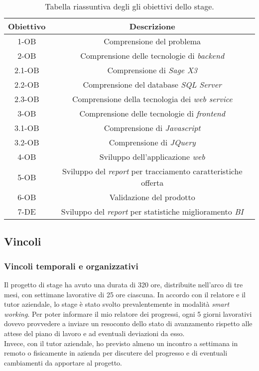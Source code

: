 \begin{center}
	\begin{longtable}{ | c| c |}
		\caption{Tabella riassuntiva degli gli obiettivi dello stage.}\\
		\hline
		\textbf{Obiettivo} & \textbf{Descrizione}\\
		\hline
		1-OB & Comprensione del problema\\
		\hline
		2-OB & Comprensione delle tecnologie di \textit{backend}\\
		\hline
		2.1-OB & Comprensione di \textit{Sage X3}\\
		\hline
		2.2-OB & Comprensione del database \textit{SQL Server}\\
		\hline
		2.3-OB & Comprensione della tecnologia dei \textit{web service}\\
		\hline
		3-OB & Comprensione delle tecnologie di \textit{frontend}\\
		\hline
		3.1-OB & Comprensione di \textit{Javascript}\\
		\hline
		3.2-OB & Comprensione di \textit{JQuery}\\
		\hline
		4-OB & Sviluppo dell'applicazione \textit{web}\\
		\hline
		5-OB & Sviluppo del \textit{report} per tracciamento caratteristiche offerta\\
		\hline
		6-OB & Validazione del prodotto\\
		\hline
		7-DE & Sviluppo del \textit{report} per statistiche miglioramento \textit{BI}\\
		\hline
	\end{longtable}
\end{center}


\subsection{Vincoli}
\subsubsection{Vincoli temporali e organizzativi}
Il progetto di stage ha avuto una durata di 320 ore, distribuite nell'arco di tre mesi, con settimane lavorative di 25 ore ciascuna.
In accordo con il relatore e il tutor aziendale, lo stage è stato svolto prevalentemente in modalità \textit{smart working}.
Per poter informare il mio relatore  dei progressi, ogni 5 giorni lavorativi dovevo provvedere a inviare un resoconto dello stato di avanzamento rispetto alle attese del piano di lavoro e ad eventuali deviazioni da esso.\\Invece, con il tutor aziendale, ho previsto almeno un incontro a settimana in remoto o fisicamente in azienda per discutere del progresso e di eventuali cambiamenti da apportare al progetto.
